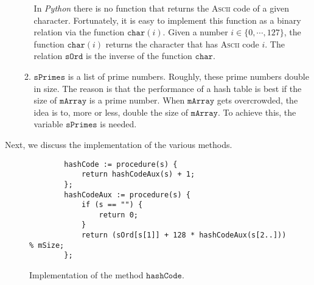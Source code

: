 \begin{enumerate}
\begin{enumerate}
        In \textsl{Python} there is no function that returns the \textsc{Ascii} code of a given character.
        Fortunately, it is easy to implement this function as a binary relation via the function
        $\texttt{char}(i)$.  Given a number $i \in \{0,\cdots,127\}$, the function $\texttt{char}(i)$
        returns the character that has \textsc{Ascii} code $i$.  The relation $\texttt{sOrd}$ is the inverse
        of the function $\texttt{char}$.
  \item $\texttt{sPrimes}$ is a list of prime numbers.  Roughly, these prime numbers double in size.
        The reason is that the performance of a hash table is best if the size of $\texttt{mArray}$ is a
        prime number.  When $\texttt{mArray}$ gets overcrowded, the idea is to, more or less, double
        the size of $\texttt{mArray}$.  To achieve this, the variable $\texttt{sPrimes}$ is needed.
  \end{enumerate}
\end{enumerate}
Next, we discuss the implementation of the various methods.

\begin{figure}[!ht]
\centering
\begin{verbatim}
        hashCode := procedure(s) {
            return hashCodeAux(s) + 1;
        };
        hashCodeAux := procedure(s) {
            if (s == "") {
                return 0;
            }
            return (sOrd[s[1]] + 128 * hashCodeAux(s[2..])) % mSize;
        };
\end{verbatim}
\vspace*{-0.3cm}
\caption{Implementation of the method $\texttt{hashCode}$.}
\label{fig:hashTable.ipython-hashCode}
\end{figure}


